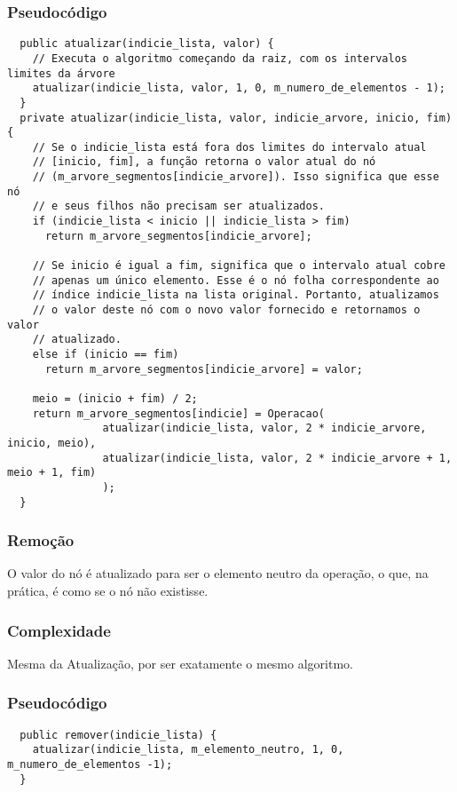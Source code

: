 \documentclass{article}
\begin{document}
\subsubsection{Pseudocódigo}
\begin{verbatim}
  public atualizar(indicie_lista, valor) {
    // Executa o algoritmo começando da raiz, com os intervalos limites da árvore
    atualizar(indicie_lista, valor, 1, 0, m_numero_de_elementos - 1);
  }
  private atualizar(indicie_lista, valor, indicie_arvore, inicio, fim) {
    // Se o indicie_lista está fora dos limites do intervalo atual 
    // [inicio, fim], a função retorna o valor atual do nó 
    // (m_arvore_segmentos[indicie_arvore]). Isso significa que esse nó
    // e seus filhos não precisam ser atualizados.
    if (indicie_lista < inicio || indicie_lista > fim) 
      return m_arvore_segmentos[indicie_arvore];

    // Se inicio é igual a fim, significa que o intervalo atual cobre 
    // apenas um único elemento. Esse é o nó folha correspondente ao 
    // índice indicie_lista na lista original. Portanto, atualizamos 
    // o valor deste nó com o novo valor fornecido e retornamos o valor
    // atualizado.
    else if (inicio == fim) 
      return m_arvore_segmentos[indicie_arvore] = valor;

    meio = (inicio + fim) / 2;
    return m_arvore_segmentos[indicie] = Operacao(
               atualizar(indicie_lista, valor, 2 * indicie_arvore, inicio, meio),
               atualizar(indicie_lista, valor, 2 * indicie_arvore + 1, meio + 1, fim) 
               );
  }
\end{verbatim}

\subsubsection{Remoção}
O valor do nó é atualizado para ser o elemento neutro da operação, o que, na prática, 
é como se o nó não existisse.
\subsubsection{Complexidade}
Mesma da Atualização, por ser exatamente o mesmo algoritmo.
\subsubsection{Pseudocódigo}
\begin{verbatim}
  public remover(indicie_lista) {
    atualizar(indicie_lista, m_elemento_neutro, 1, 0, m_numero_de_elementos -1);
  }
\end{verbatim}
\end{document}
